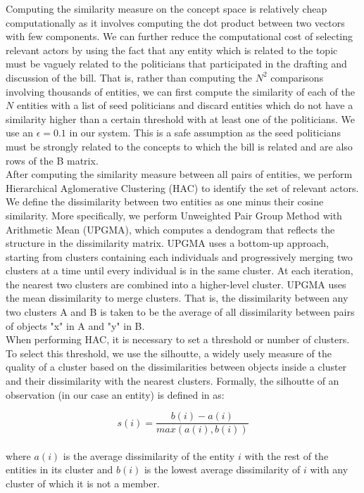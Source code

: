 Computing the similarity measure on the concept space is relatively cheap computationally as it involves computing the dot product between two vectors with few components. We can further reduce the computational cost of selecting relevant actors by using the fact that any entity which is related to the topic must be vaguely related to the politicians that participated in the drafting and discussion of the bill. That is, rather than computing the $N^2$ comparisons involving thousands of entities, we can first compute the similarity of each of the $N$ entities with a list of seed politicians and discard entities which do not have a similarity higher than a certain threshold with at least one of the politicians. We use an $\epsilon = 0.1$ in our system. This is a safe assumption as the seed politicians must be strongly related to the concepts to which the bill is related and are also rows of the B matrix. \\

After computing the similarity measure between all pairs of entities, we perform Hierarchical Aglomerative Clustering (HAC) to identify the set of relevant actors. We define the dissimilarity between two entities as one minus their cosine similarity. More specifically, we perform Unweighted Pair Group Method with Arithmetic Mean (UPGMA), which computes a dendogram that reflects the structure in the dissimilarity matrix. UPGMA uses a bottom-up approach, starting from clusters containing each individuals and progressively merging two clusters at a time until every individual is in the same cluster. At each iteration, the nearest two clusters are combined into a higher-level cluster. UPGMA uses the mean dissimilarity to merge clusters. That is, the dissimilarity between any two clusters A and B is taken to be the average of all dissimilarity between pairs of objects "x" in A and "y" in B. \\

When performing HAC, it is necessary to set a threshold or number of clusters. To select this threshold, we use the silhoutte, a widely usely measure of the quality of a cluster based on the dissimilarities between objects inside a cluster and their dissimilarity with the nearest clusters. Formally, the silhoutte of an observation (in our case an entity) is defined in \cite{rousseeuw1987silhouettes} as:

$$s(i) = \frac{b(i)-a(i)}{max(a(i),b(i))}$$\\

where $a(i)$ is the average dissimilarity of the entity $i$ with the rest of the entities in its cluster and $b(i)$ is the lowest average dissimilarity  of $i$ with any cluster of which it is not a member. \\

